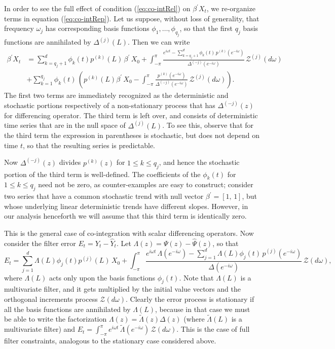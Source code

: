 \documentclass[a4paper]{book}
\begin{document}
In order to see the full effect of condition
 (\ref{eq:co-intRel}) on $\beta^{\prime} X_t$, we re-organize terms
 in equation (\ref{eq:co-intRep}).  Let us suppose, without loss of
 generality, that frequency $\omega_j$ has corresponding basis
 functions $\phi_1, \ldots, \phi_{q_j}$, so that the first $q_j$
 basis functions are annihilated by  $\Delta^{(j)}(L)$.  Then we can write
\begin{align*}
 \beta^{\prime} X_t & = \sum_{k= q_j + 1}^d \phi_k (t) p^{(k)} (L) \, 
  \beta^{\prime} \, X_{0}
  + \int_{-\pi}^{\pi} \frac{ e^{i \omega t} - \sum_{k= q_j + 1}^d \phi_k (t) 
    \, p^{(k)} ( e^{-i \omega  } )}{ \Delta^{(-j)} (e^{-i \omega}) } \,  \mathcal{Z}^{(j)}
 (d\omega) \\
 & + \sum_{k=1}^{q_j} \phi_k (t) \,  \left(p^{(k)} (L)  
   \beta^{\prime} \,  X_0 - \int_{-\pi}^{\pi} \frac{ p^{(k)} (e^{-i \omega}) }{
 \Delta^{(-j)} (e^{-i \omega}) } \, \mathcal{Z}^{(j)} (d\omega) \right).
\end{align*}
 The first two terms are immediately recognized as the deterministic
 and stochastic portions respectively of a non-stationary process
 that has $\Delta^{(-j)} (z)$ for differencing operator.  The third
 term is left over, and consists of deterministic time series that
 are in the null space of $\Delta^{(j)} (L)$.  
  To see this, observe that for the third term the expression in parentheses is
stochastic, but does not depend on time $t$, so that the resulting series is predictable.


Now $\Delta^{(-j)} (z)$  divides $p^{(k)} (z)$ for $1 \leq k \leq q_j$,
  and hence the stochastic portion of
 the third term is well-defined.   The
 coefficients of the $\phi_k (t)$ for $1 \leq k \leq q_j$ need not be
 zero, as counter-examples are easy to construct; consider two series that
 have a common stochastic trend with null vector $\beta^{\prime} =
 [1, \, 1]$, but whose underlying linear deterministic trends have
different slopes.  However, in our analysis henceforth we
will assume that this third term is identically zero.

 This is the general case  of co-integration with scalar differencing operators.  
 Now consider the  filter error $E_t = Y_t - \widehat{Y}_t$.  Let $\Lambda(z) = \Psi
 (z) - \widehat{\Psi} (z)$, so that
\[
 E_t = \sum_{j=1}^d \Lambda(L) \phi_j (t) p^{(j)} (L) \, X_{0} + \int_{-\pi}^{\pi}
 \frac{ e^{i \omega t} \, \Lambda (e^{-i \omega})
 - \sum_{j=1}^d \Lambda (L) \phi_j (t) \, p^{(j)} ( e^{-i \omega
 } )}{ \Delta (e^{-i \omega}) } \, \mathcal{Z}  (d\omega),
\]
 where $\Lambda (L)$ acts only upon the basis functions $\phi_j (t)$.
    Note that $\Lambda (L) $ is a multivariate filter,
     and it gets multiplied by the initial value
  vectors and the orthogonal increments process $\mathcal{Z} (d\omega)$.
  Clearly the error process is stationary if all the basis functions
  are annihilated by $\Lambda (L)$, because in that case we must be
  able to write the factorization
  $\Lambda (z) = \widetilde{\Lambda} (z)  \Delta (z)$ (where $\widetilde{\Lambda} (L) $ is
  a  multivariate filter) and $E_t
  = \int_{-\pi}^{\pi} e^{i \omega t } \, \widetilde{\Lambda} (e^{-i \omega}) \,
  \mathcal{Z}  (d\omega)$.  This is the case of full filter constraints,
  analogous to the stationary case considered above.
 
\end{document}
